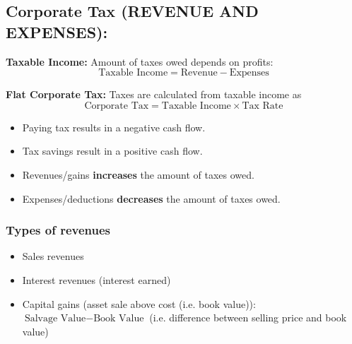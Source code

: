 \subsection{Corporate Tax (REVENUE AND EXPENSES):}
\begin{definition}
    \textbf{Taxable Income:} Amount of taxes owed depends on profits:
    \begin{equation*}
        \text{Taxable Income} = \text{Revenue} - \text{Expenses}
    \end{equation*}
    \vspace{1em}

    \textbf{Flat Corporate Tax:} Taxes are calculated from taxable income as
    \begin{equation*}
        \text{Corporate Tax} = \text{Taxable Income} \times \text{Tax Rate}
    \end{equation*}
    \begin{itemize}
        \item Paying tax results in a negative cash flow.
        \item Tax savings result in a positive cash flow.
        \item Revenues/gains \textbf{increases} the amount of taxes owed.
        \item Expenses/deductions \textbf{decreases} the amount of taxes owed.
    \end{itemize}  
    
\end{definition}

\subsubsection{Types of revenues}
\begin{terminology}
    \begin{itemize}
        \item Sales revenues
        \item Interest revenues (interest earned)
        \item Capital gains (asset sale above cost (i.e. book value)): $\text{Salvage Value} - \text{Book Value}$ (i.e. difference between selling price and book value)
    \end{itemize}
\end{terminology}

